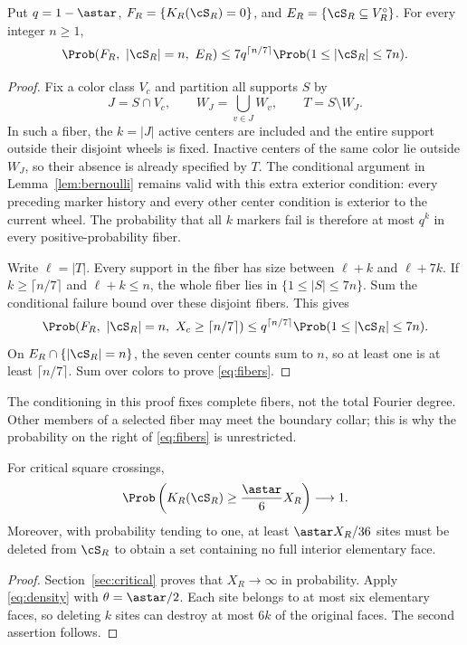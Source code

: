 \begin{lemma}\label{lem:fibers}
Put $q=1-\astar$, $F_R=\{K_R(\cS_R)=0\}$, and $E_R=\{\cS_R\subseteq V_R^\circ\}$. For every integer $n\ge1$,
\begin{equation}\label{eq:fibers}
 \Prob(F_R,\ |\cS_R|=n,\ E_R)
 \le7q^{\lceil n/7\rceil}\Prob(1\le|\cS_R|\le7n).
\end{equation}
\end{lemma}
\begin{proof}
Fix a color class $V_c$ and partition all supports $S$ by
\[
 J=S\cap V_c,\qquad W_J=\bigcup_{v\in J}W_v,
 \qquad T=S\setminus W_J.
\]
In such a fiber, the $k=|J|$ active centers are included and the entire support outside their disjoint wheels is fixed. Inactive centers of the same color lie outside $W_J$, so their absence is already specified by $T$. The conditional argument in Lemma~\ref{lem:bernoulli} remains valid with this extra exterior condition: every preceding marker history and every other center condition is exterior to the current wheel. The probability that all $k$ markers fail is therefore at most $q^k$ in every positive-probability fiber.

Write $\ell=|T|$. Every support in the fiber has size between $\ell+k$ and $\ell+7k$. If $k\ge\lceil n/7\rceil$ and $\ell+k\le n$, the whole fiber lies in $\{1\le|S|\le7n\}$. Sum the conditional failure bound over these disjoint fibers. This gives
\[
 \Prob(F_R,\ |\cS_R|=n,\ X_c\ge\lceil n/7\rceil)
 \le q^{\lceil n/7\rceil}\Prob(1\le|\cS_R|\le7n).
\]
On $E_R\cap\{|\cS_R|=n\}$, the seven center counts sum to $n$, so at least one is at least $\lceil n/7\rceil$. Sum over colors to prove \eqref{eq:fibers}.
\end{proof}

The conditioning in this proof fixes complete fibers, not the total Fourier degree. Other members of a selected fiber may meet the boundary collar; this is why the probability on the right of \eqref{eq:fibers} is unrestricted.

\begin{corollary}\label{cor:robust}
For critical square crossings,
\[
 \Prob\left(K_R(\cS_R)\ge\frac{\astar}{6}X_R\right)\longrightarrow1.
\]
Moreover, with probability tending to one, at least $\astar X_R/36$ sites must be deleted from $\cS_R$ to obtain a set containing no full interior elementary face.
\end{corollary}
\begin{proof}
Section~\ref{sec:critical} proves that $X_R\to\infty$ in probability. Apply \eqref{eq:density} with $\theta=\astar/2$. Each site belongs to at most six elementary faces, so deleting $k$ sites can destroy at most $6k$ of the original faces. The second assertion follows.
\end{proof}

